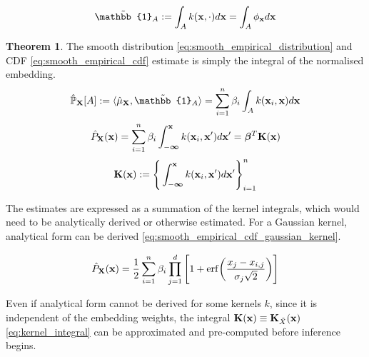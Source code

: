 \documentclass[twoside]{article} \usepackage{aistats2017}
\theoremstyle{definition}
\theoremstyle{theorem}
\newtheorem{theorem}{Theorem}[section]
\newcommand{\rv}[1]{{#1}}
\newcommand{\ds}[1]{\tilde{#1}}
\newcommand{\inner}[2]{{\langle #1, #2 \rangle}}
\begin{document}
		\begin{equation}
			\tilde{\mathbb{1}}_{A} := \int_{A} k(\bvec{x}, \cdot) d\bvec{x} = \int_{A} \phi_{\bvec{x}} d\bvec{x}
		\label{eq:indicator_smooth}
		\end{equation}
		
		\begin{theorem} \label{thm:smooth_empirical_distribution_and_cdf}
			The smooth distribution \eqref{eq:smooth_empirical_distribution} and CDF \eqref{eq:smooth_empirical_cdf} estimate is simply the integral of the normalised embedding.
			\begin{equation}
				\hat{\mathbb{P}}_{\bvec{\rv{X}}}[A] := \inner{\hat{\mu}_{\bvec{\rv{X}}}}{\tilde{\mathbb{1}}_{A}} = \sum_{i = 1}^{n} \beta_{i} \int_{A}  k(\bvec{x}_{i}, \bvec{x}) d\bvec{x}
			\label{eq:smooth_empirical_distribution}
			\end{equation}	
			\begin{equation}
				\hat{P}_{\bvec{\rv{X}}}(\bvec{x}) = \sum_{i = 1}^{n} \beta_{i} \int_{-\bm{\infty}}^{\bvec{x}}  k(\bvec{x}_{i}, \bvec{x}') d\bvec{x}' = \bm{\beta}^{T} \bvec{K}(\bvec{x})
			\label{eq:smooth_empirical_cdf}
			\end{equation}
			\begin{equation}
				\mathbf{K}(\mathbf{x}) := \Bigg\{ \int_{-\bm{\infty}}^{\mathbf{x}}  k(\mathbf{x}_{i}, \mathbf{x}') d\mathbf{x}' \Bigg\}_{i = 1}^{n}
			\label{eq:kernel_integral}
			\end{equation}
		\end{theorem}

		The estimates are expressed as a summation of the kernel integrals, which would need to be analytically derived or otherwise estimated. For a Gaussian kernel, analytical form can be derived \eqref{eq:smooth_empirical_cdf_gaussian_kernel}.

		\begin{equation}
			\hat{P}_{\bvec{\rv{X}}}(\bvec{x}) = \frac{1}{2} \sum_{i = 1}^{n} \beta_{i} \prod_{j = 1}^{d} \Bigg[1 + \mathrm{erf}\bigg(\frac{x_{j} - x_{i, j}}{\sigma_{j} \sqrt{2}}\bigg)\Bigg]
		\label{eq:smooth_empirical_cdf_gaussian_kernel}
		\end{equation}

		Even if analytical form cannot be derived for some kernels $k$, since it is independent of the embedding weights, the integral $\bvec{K}(\bvec{x}) \equiv \bvec{K}_{\ds{X}}(\bvec{x})$ \eqref{eq:kernel_integral} can be approximated and pre-computed before inference begins.
\end{document}
